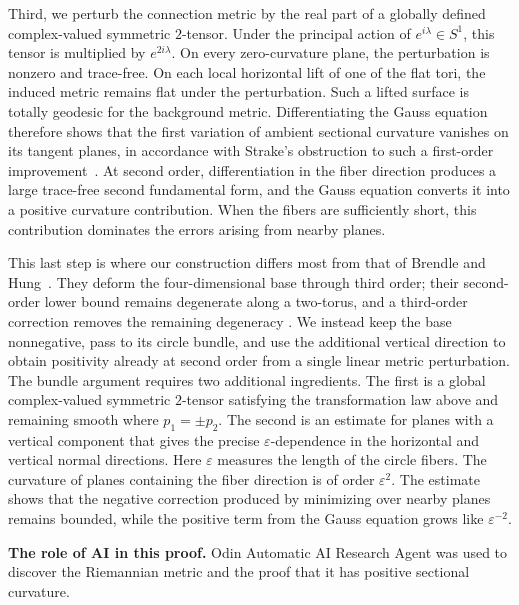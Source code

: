 \documentclass[11pt]{article}
\theoremstyle{definition}
\theoremstyle{remark}
\newcommand{\eps}{\varepsilon}
\begin{document}
Third, we perturb the connection metric by the real part of a globally
defined complex-valued symmetric $2$-tensor.  Under the principal action of
$e^{i\lambda}\in S^1$, this tensor is multiplied by $e^{2i\lambda}$.  On every
zero-curvature plane, the perturbation is nonzero and trace-free.  On each local
horizontal lift of one of the flat tori, the induced metric remains flat
under the perturbation.  Such a lifted surface is totally geodesic for the
background metric.  Differentiating the Gauss equation therefore shows that
the first variation of ambient sectional curvature vanishes on its tangent
planes, in accordance with Strake's obstruction to such a first-order
improvement~\cite[Lemma~4.1]{Strake1987}.  At second order, differentiation in
the fiber direction produces a large trace-free second fundamental form, and
the Gauss equation converts it into a positive curvature contribution.  When
the fibers are sufficiently short, this contribution dominates the errors
arising from nearby planes.

This last step is where our construction differs most from that of Brendle and
Hung~\cite{BrendleHung2026}.  They deform the four-dimensional base
through third order; their second-order lower bound remains degenerate along
a two-torus, and a third-order correction removes the remaining degeneracy
\cite[Propositions~5.2 and~6.1]{BrendleHung2026}.  We
instead keep the base nonnegative, pass to its circle bundle, and use the
additional vertical direction to obtain positivity already at second order
from a single linear metric perturbation.  The bundle argument requires two
additional ingredients.  The first is a global complex-valued symmetric
$2$-tensor satisfying the transformation law above and remaining smooth where
$p_1=\pm p_2$.  The second is an estimate for planes with a vertical component
that gives the precise $\eps$-dependence in the horizontal and vertical normal
directions.  Here $\eps$ measures the length of the circle fibers.
The curvature of planes containing the fiber direction is of order $\eps^2$.
The estimate shows that the negative correction produced by minimizing over
nearby planes remains bounded, while the positive term from
the Gauss equation grows like $\eps^{-2}$.

\vspace{3pt}

\noindent\textbf{The role of AI in this proof.}
Odin Automatic AI Research Agent was used to discover the Riemannian metric and the proof that it has positive sectional curvature.
\end{document}
